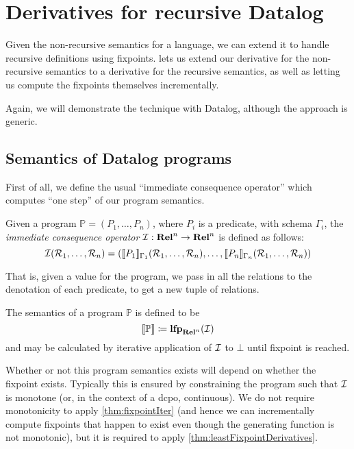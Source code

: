 \section{Derivatives for recursive Datalog}
\label{sec:recursiveDatalog}

Given the non-recursive semantics for a language, we can extend it to handle
recursive definitions using fixpoints.  lets us extend our
derivative for the non-recursive semantics to a derivative for the recursive
semantics, as well as letting us compute the fixpoints themselves
incrementally. 

Again, we will demonstrate the technique with Datalog, although the approach is generic.

\subsection{Semantics of Datalog programs}

First of all, we define the usual ``immediate consequence operator'' which
computes ``one step'' of our program semantics.

\begin{defn}
  Given a program $\mathbb{P} = (P_1, \dots, P_n)$, where $P_i$ is a predicate,
  with schema $\Gamma_i$, the \emph{immediate consequence operator} $\mathcal{I}: \mathbf{Rel}^n \rightarrow \mathbf{Rel}^n$ is defined 
  as follows:
  \begin{displaymath}
    \mathcal{I}(\mathcal{R}_1, \dots, \mathcal{R}_n) 
    = (\llbracket P_1 \rrbracket_{\Gamma_1}(\mathcal{R}_1, \dots, \mathcal{R}_n), \dots, \llbracket P_n \rrbracket_{\Gamma_n}(\mathcal{R}_1, \dots, \mathcal{R}_n))
  \end{displaymath}
\end{defn}

That is, given a value for the program, we pass in all the relations
to the denotation of each predicate, to get a new tuple of relations.

\begin{defn}
  The semantics of a program $\mathbb{P}$ is defined to be
  \begin{displaymath}
    \llbracket \mathbb{P} \rrbracket \coloneqq \mathbf{lfp}_{\mathbf{Rel}^n}(\mathcal{I})
  \end{displaymath}
  and may be calculated by iterative application of $\mathcal{I}$ to $\bot$ until
  fixpoint is reached.
\end{defn}

Whether or not this program semantics exists will depend on whether the fixpoint
exists. Typically this is ensured by constraining the program such that $\mathcal{I}$
is monotone (or, in the context of a dcpo, continuous). We do not require monotonicity
to apply \cref{thm:fixpointIter} (and hence we can incrementally
compute fixpoints that happen to exist even though the generating function is
not monotonic), but it is required to apply \cref{thm:leastFixpointDerivatives}.

